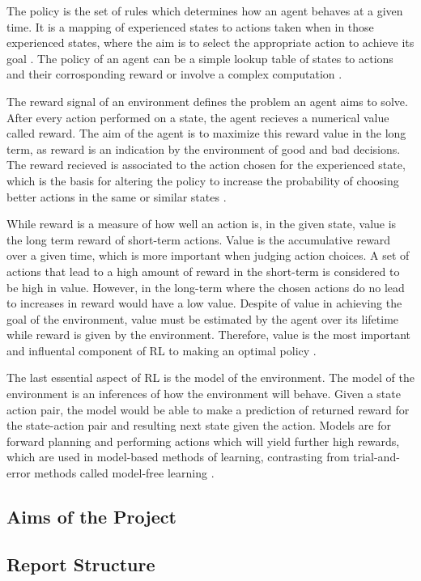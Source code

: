 The policy is the set of rules which determines how an agent behaves at a given time. It is a mapping of experienced states to actions taken when in those experienced states, where the aim is to select the appropriate action to achieve its goal \cite{GabrieleDe}. The policy of an agent can be a simple lookup table of states to actions and their corrosponding reward or involve a complex computation \cite{Sutton1}. 

The reward signal of an environment defines the problem an agent aims to solve. After every action performed on a state, the agent recieves a numerical value called reward. The aim of the agent is to maximize this reward value in the long term, as reward is an indication by the environment of good and bad decisions. The reward recieved is associated to the action chosen for the experienced state, which is the basis for altering the policy to increase the probability of choosing better actions in the same or similar states \cite{Sutton1}. 

While reward is a measure of how well an action is, in the given state, value is the long term reward of short-term actions. Value is the accumulative reward over a given time, which is more important when judging action choices. A set of actions that lead to a high amount of reward in the short-term is considered to be high in value. However, in the long-term where the chosen actions do no lead to increases in reward would have a low value. Despite of value in achieving the goal of the environment, value must be estimated by the agent over its lifetime while reward is given by the environment. Therefore, value is the most important and influental component of RL to making an optimal policy \cite{Sutton1}. 

The last essential aspect of RL is the model of the environment. The model of the environment is an inferences of how the environment will behave. Given a state action pair, the model would be able to make a prediction of returned reward for the state-action pair and resulting next state given the action. Models are for forward planning and performing actions which will yield further high rewards, which are used in model-based methods of learning, contrasting from trial-and-error methods called model-free learning \cite{Sutton1}.



\subsection{Aims of the Project}
\subsection{Report Structure}
